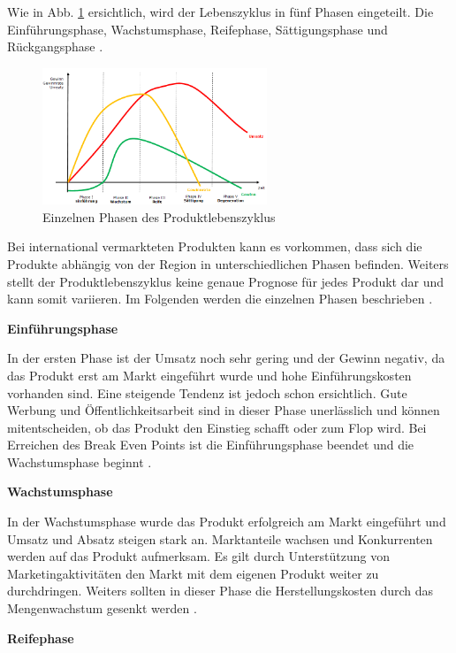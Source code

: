 Wie in Abb. \ref{img:produktlebenszyklus} ersichtlich, wird der Lebenszyklus in fünf Phasen eingeteilt. Die Einführungsphase, Wachstumsphase, Reifephase, Sättigungsphase und Rückgangsphase \cite{Poeschek00}. 

\begin{figure}[h!]
	\centering
	\includegraphics[width=0.6\textwidth]{BilderAllgemein/produktlebenszyklus.png}
	\caption{Einzelnen Phasen des Produktlebenszyklus \cite{Deef09}}
	\label{img:produktlebenszyklus}
\end{figure}

Bei international vermarkteten Produkten kann es vorkommen, dass sich die Produkte abhängig von der Region in unterschiedlichen Phasen befinden. Weiters stellt der Produktlebenszyklus keine genaue Prognose für jedes Produkt dar und kann somit variieren. Im Folgenden werden die einzelnen Phasen beschrieben \cite{Poeschek00}.

\textbf{Einführungsphase}

In der ersten Phase ist der Umsatz noch sehr gering und der Gewinn negativ, da das Produkt erst am Markt eingeführt wurde und hohe Einführungskosten vorhanden sind. Eine steigende Tendenz ist jedoch schon ersichtlich. Gute Werbung und Öffentlichkeitsarbeit sind in dieser Phase unerlässlich und können mitentscheiden, ob das Produkt den Einstieg schafft oder zum Flop wird. Bei Erreichen des Break Even Points ist die Einführungsphase beendet und die Wachstumsphase beginnt \cite{Poeschek00}.

\textbf{Wachstumsphase}

In der Wachstumsphase wurde das Produkt erfolgreich am Markt eingeführt und Umsatz und Absatz steigen stark an. Marktanteile wachsen und Konkurrenten werden auf das Produkt aufmerksam. Es gilt durch Unterstützung von Marketingaktivitäten den Markt mit dem eigenen Produkt weiter zu durchdringen. Weiters sollten in dieser Phase die Herstellungskosten durch das Mengenwachstum gesenkt werden \cite{Poeschek00}.

\textbf{Reifephase}

